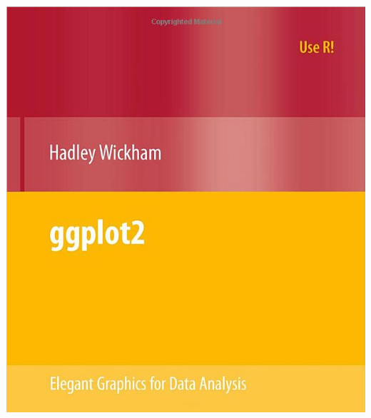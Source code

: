 \documentclass{beamer}\usepackage{graphicx, color}
\begin{document}
\begin{frame}[fragile]
\includegraphics[scale=.15]{images/hadley.png}
\end{frame}

\end{document}
